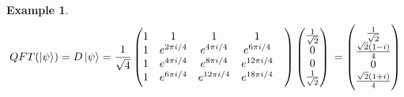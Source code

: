 \documentclass[]{book}
\newtheorem*{example}{Example}
\theoremstyle{nonumberplain}
\begin{document}
\begin{itemize}
\begin{example}
$$        QFT(\ket{\psi}) = D\ket{\psi} = \frac{1}{\sqrt{4}} 
        \begin{pmatrix} 1&1&1&1& \\  1&e^{2 \pi i /4}&e^{4 \pi i /4}&e^{6 \pi i /4}\\  1&e^{4 \pi i /4}&e^{8 \pi i /4}&e^{12 \pi i /4}\\  1&e^{6 \pi i /4}&e^{12 \pi i /4}&e^{18 \pi i /4} \end{pmatrix} \begin{pmatrix} \frac{1}{\sqrt{2}} \\ 0 \\ 0 \\\frac{1}{\sqrt{2}} \end{pmatrix} \\
        = \begin{pmatrix} \frac{1}{\sqrt{2}} \\ \frac{\sqrt{2}(1-i)}{4} \\ 0  \\ \frac{\sqrt{2}(1+i)}{4} \end{pmatrix}$$
\end{example}
\end{itemize}
\end{document}

